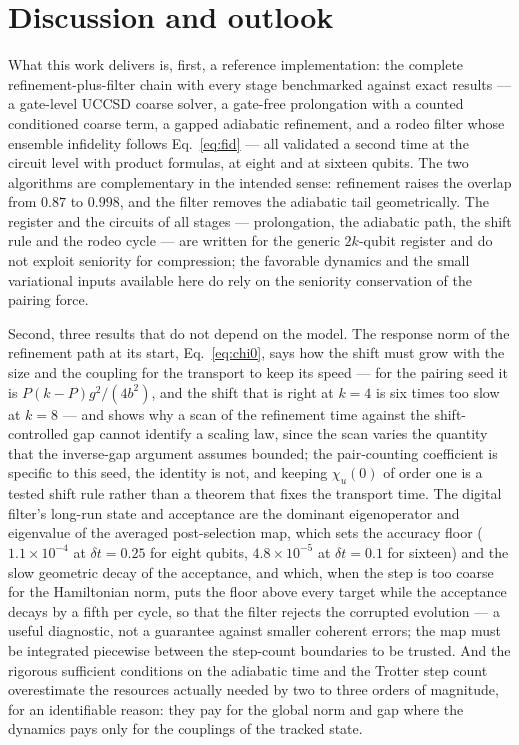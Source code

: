 \documentclass[
  aps,            %
  prc,            %
  reprint,        %
  superscriptaddress,
  floatfix,
  nofootinbib
]{revtex4-2}
\begin{document}
\section{Discussion and outlook}
\label{sec:discussion}
What this work delivers is, first, a reference implementation: the
complete refinement-plus-filter chain with every stage benchmarked against
exact results --- a gate-level UCCSD coarse solver, a gate-free prolongation
with a counted conditioned coarse term, a gapped adiabatic refinement, and a
rodeo filter whose ensemble infidelity follows Eq.~\eqref{eq:fid} --- all
validated a second time at the circuit level with product formulas, at
eight and at sixteen qubits.  The two algorithms are complementary in the
intended sense: refinement raises the overlap from $0.87$ to $0.998$, and
the filter removes the adiabatic tail geometrically.  The register and the
circuits of all stages --- prolongation, the adiabatic path, the shift rule
and the rodeo cycle --- are written for the generic $2k$-qubit register and
do not exploit seniority for compression; the favorable dynamics and the
small variational inputs available here do rely on the seniority
conservation of the pairing force.

Second, three results that do not depend on the model.  The response norm
of the refinement path at its start, Eq.~\eqref{eq:chi0}, says how the
shift must grow with the size and the coupling for the transport to keep
its speed --- for the pairing seed it is $P(k-P)g^2/(4b^2)$, and the shift
that is right at $k=4$ is six times too slow at $k=8$ --- and shows why a
scan of the refinement time against the shift-controlled gap cannot
identify a scaling law, since the scan varies the quantity that the
inverse-gap argument assumes bounded; the pair-counting coefficient is
specific to this seed, the identity is not, and keeping $\chi_u(0)$ of
order one is a tested shift rule rather than a theorem that fixes the
transport time.  The digital filter's long-run state and acceptance are the
dominant eigenoperator and eigenvalue of the averaged post-selection map,
which sets the accuracy floor ($1.1\times10^{-4}$ at $\delta t=0.25$ for
eight qubits, $4.8\times10^{-5}$ at $\delta t=0.1$ for sixteen) and the
slow geometric decay of the acceptance, and which, when the step is too
coarse for the Hamiltonian norm, puts the floor above every target while
the acceptance decays by a fifth per cycle, so that the filter rejects the
corrupted evolution --- a useful diagnostic, not a guarantee against
smaller coherent errors; the map must be integrated piecewise between the
step-count boundaries to be trusted.  And the rigorous sufficient
conditions on the adiabatic time and the Trotter step count overestimate the
resources actually needed by two to three orders of magnitude, for an
identifiable reason: they pay for the global norm and gap where the dynamics
pays only for the couplings of the tracked state.
\end{document}
